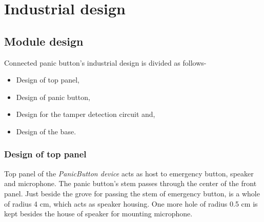 


\section{Industrial design}
\subsection{Module design}
Connected panic button's industrial design is divided as follows-
\begin{itemize}
\item Design of top panel,
\item Design of panic button,
\item Design for the tamper detection circuit and,
\item Design of the base.
\end{itemize}

\subsubsection{Design of top panel}
Top panel of the \emph{PanicButton device} acts as host to emergency button, speaker and microphone. The panic button's stem passes through the center of the front panel. Just beside the grove for passing the stem of emergency button, is a whole of radius 4 cm, which acts as speaker housing. One more hole of radius 0.5 cm is kept besides the house of speaker for mounting microphone. 


